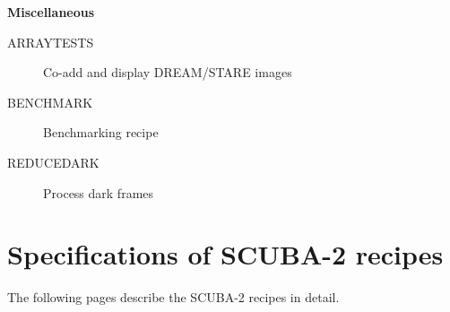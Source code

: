 \documentclass[twoside,11pt]{article}
\newcommand{\htmlref}[2]{#1}
\newcommand{\xlabel}[1]{}
\renewcommand{\_}{\texttt{\symbol{95}}}
\newcommand{\classitem}[1]{\item [\htmlref{#1}{#1}]}
\begin{document}
\begin{small}
{\large
\begin{center}
{\bf Miscellaneous}
\end{center}
}
\begin{description}
\classitem{ARRAY\_TESTS}
Co-add and display DREAM/STARE images
\classitem{BENCHMARK}
Benchmarking recipe
\classitem{REDUCE\_DARK}
Process dark frames
\end{description}


\end{small}
\newpage

\section{\xlabel{ap_full}Specifications of SCUBA-2 recipes\label{ap:full}}

The following pages describe the SCUBA-2 recipes in detail.
\end{document}
